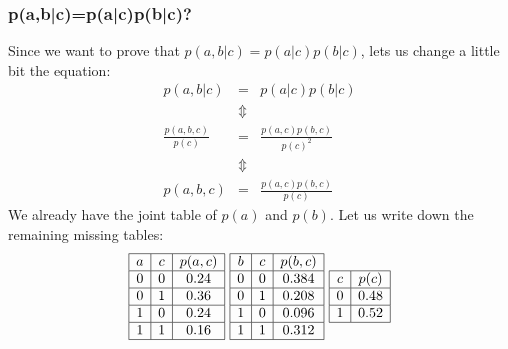 \documentclass{article}
\begin{document}
            \subsubsection{p(a,b|c)=p(a|c)p(b|c)?}
                Since we want to prove that $p(a,b|c)=p(a|c)p(b|c)$, lets us change a little bit the equation:
                \[
                    \begin{array}{rcl}
                        p(a,b|c) &=& p(a|c)p(b|c)\\
                        &\Updownarrow&\\
                        \frac{p(a,b,c)}{p(c)} &=& \frac{p(a,c)p(b,c)}{p(c)^2}\\
                        &\Updownarrow&\\
                        p(a,b,c) &=& \frac{p(a,c)p(b,c)}{p(c)}
                    \end{array}
                \]
                We already have the joint table of $p(a)$ and $p(b)$. Let us write down the remaining missing tables:
                \[
                    \begin{array}{|c|c|c|}
                        \hline
                        a&c&p(a,c)\\
                        \hline
                        0&0&0.24\\
                        \hline
                        0&1&0.36\\
                        \hline
                        1&0&0.24\\
                        \hline
                        1&1&0.16\\
                        \hline
                    \end{array}
                    \text{ }
                    \begin{array}{|c|c|c|}
                        \hline
                        b&c&p(b, c)\\
                        \hline
                        0&0&0.384\\
                        \hline
                        0&1&0.208\\
                        \hline
                        1&0&0.096\\
                        \hline
                        1&1&0.312\\
                        \hline
                    \end{array}
                    \text{ }
                    \begin{array}{|c|c|}
                        \hline
                        c&p(c)\\
                        \hline
                        0&0.48\\
                        \hline
                        1&0.52\\
                        \hline
                    \end{array}
                \]
\end{document}
